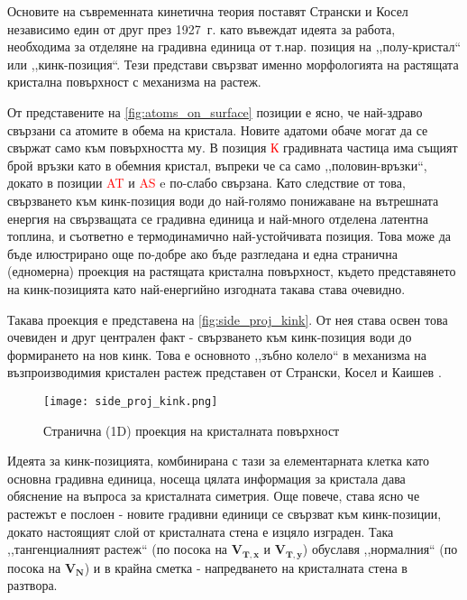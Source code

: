 Основите на съвременната кинетична теория поставят Странски и Косел независимо един от друг през 1927~г. \cite{Stranski1928}\cite{Kossel1927} като въвеждат идеята за работа, необходима за отделяне на градивна единица от т.нар. позиция на ,,полу-кристал`` или ,,кинк-позиция``. Тези представи свързват именно морфологията на растящата кристална повърхност с механизма на растеж.

От представените на  \autoref{fig:atoms_on_surface} позиции е ясно, че най-здраво свързани са атомите в обема на кристала. Новите адатоми обаче могат да се свържат само към повърхността му. В позиция \textcolor{red}{К} градивната частица има същият брой връзки като в обемния кристал, въпреки че са само ,,половин-връзки``, докато в позиции \textcolor{red}{AT} и \textcolor{red}{AS} e по-слабо свързана. Като следствие от това, свързването към кинк-позиция води до най-голямо понижаване на вътрешната енергия на свързващата се градивна единица и най-много отделена латентна топлина, и съответно е термодинамично най-устойчивата позиция. Това може да бъде илюстрирано още по-добре ако бъде разгледана и една странична (едномерна) проекция на растящата кристална повърхност, където представянето на кинк-позицията като най-енергийно изгодната такава става очевидно.

Такава проекция е представена на \autoref{fig:side_proj_kink}. От нея става освен това очевиден и друг централен факт - свързването към кинк-позиция води до формирането на нов кинк.
Това е основното ,,зъбно колело`` в механизма на възпроизводимия кристален растеж представен от Странски, Косел и Каишев \cite{Stranski1928} \cite{Kossel1927} \cite{StranskiKaischew1931}.
\begin{figure}[H]
	\centering
	\texttt{[image: side\_proj\_kink.png]}
	\caption{Странична (1D) проекция на кристалната повърхност}
	\label{fig:side_proj_kink}
\end{figure}

Идеята за кинк-позицията, комбинирана с тази за елементарната клетка като основна градивна единица, носеща цялата информация за кристала дава обяснение на въпроса за кристалната симетрия. Още повече, става ясно че растежът е послоен - новите градивни единици се свързват към кинк-позиции, докато настоящият слой от кристалната стена е изцяло изграден. Така ,,тангенциалният растеж`` (по посока на  $\boldsymbol{V_{T,x}}$ и $\boldsymbol{V_{T,y}}$) обуславя ,,нормалния`` (по посока на $\boldsymbol{V_{N}}$) и в крайна сметка - напредването на кристалната стена в разтвора.

